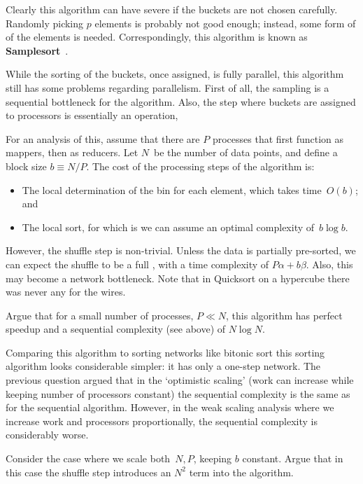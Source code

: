 Clearly this algorithm can have severe 
if the buckets are not chosen carefully. Randomly picking $p$ elements is
probably not good enough; instead, some form of 
of the elements is needed. Correspondingly, this algorithm is known as
\textbf{Samplesort}~\cite{Blelloch:1991:CM2sort}.

While the sorting of the buckets, once assigned, is fully parallel,
this algorithm still has some problems regarding parallelism.
First of all, the sampling is a sequential bottleneck for the algorithm.
Also, the step where buckets are assigned to processors is essentially
an  operation, 

For an analysis of this, assume that there are $P$ processes that
first function as mappers, then as reducers. Let $N$~be the number of
data points, and define a block size $b\equiv N/P$. The cost of the
processing steps of the algorithm is:
\begin{itemize}
\item The local determination of the bin for each element, which takes
  time~$O(b)$; and
\item The local sort, for which is we can assume an optimal complexity
  of~$b\log b$.
\end{itemize}
However, the shuffle step is non-trivial. Unless the data is partially
pre-sorted, we can expect the shuffle to be a full
, with a time complexity of $P\alpha+b\beta$.
Also, this may become a network bottleneck.
Note that in Quicksort on a hypercube there was never any
 for the wires.

\begin{exercise}
  Argue that for a small number of processes, $P\ll N$, this algorithm
  has perfect speedup and a sequential complexity (see above) of
  $N\log N$.
\end{exercise}

Comparing this algorithm to sorting networks like bitonic sort
this sorting algorithm looks considerable simpler: it has only a
one-step network. The previous question argued that in the `optimistic
scaling' (work can increase while keeping number of processors
constant) the sequential complexity is the same as for the sequential
algorithm. However, in the weak scaling analysis where we increase
work and processors proportionally, the sequential complexity is
considerably worse.

\begin{exercise}
  Consider the case where we scale both~$N,P$, keeping $b$
  constant.
  Argue that in this case the shuffle step introduces an $N^2$ term
  into the algorithm.
\end{exercise}

